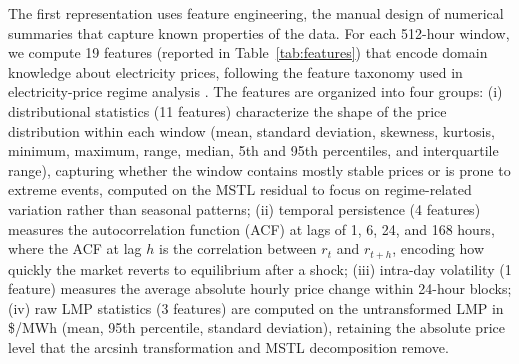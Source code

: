 \documentclass[12pt]{article}
\begin{document}
The first representation uses feature engineering, the manual design of numerical summaries that capture known properties of the data.
For each 512-hour window, we compute 19 features (reported in Table~\ref{tab:features}) that encode domain knowledge about electricity prices, following the feature taxonomy used in electricity-price regime analysis \citep{escribano2011, knittel2005}.
The features are organized into four groups:
(i) distributional statistics (11 features) characterize the shape of the price distribution within each window (mean, standard deviation, skewness, kurtosis, minimum, maximum, range, median, 5th and 95th percentiles, and interquartile range), capturing whether the window contains mostly stable prices or is prone to extreme events, computed on the MSTL residual to focus on regime-related variation rather than seasonal patterns;
(ii) temporal persistence (4 features) measures the autocorrelation function (ACF) at lags of 1, 6, 24, and 168 hours, where the ACF at lag $h$ is the correlation between $r_t$ and $r_{t+h}$, encoding how quickly the market reverts to equilibrium after a shock;
(iii) intra-day volatility (1 feature) measures the average absolute hourly price change within 24-hour blocks;
(iv) raw LMP statistics (3 features) are computed on the untransformed LMP in \$/MWh (mean, 95th percentile, standard deviation), retaining the absolute price level that the arcsinh transformation and MSTL decomposition remove.
\end{document}

